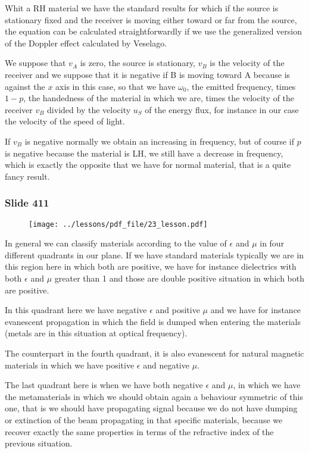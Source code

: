 \documentclass[../main/main.tex]{subfiles}
\begin{document}
Whit a RH material we have the standard results for which if the source is stationary fixed and the receiver is moving either toward or far from the source, the equation can be calculated straightforwardly if we use the generalized version of the Doppler effect calculated by Veselago.

We suppose that $v_A$ is zero, the source is stationary, $v_B$ is the velocity of the receiver and we suppose that it is negative if B is moving toward A because is against the $x$ axis in this case, so that we have $\omega_0$, the emitted frequency, times $1-p$, the handedness of the material in which we are, times the velocity of the receiver $v_B$ divided by the velocity $u_S$ of the energy flux, for instance in our case the velocity of the speed of light.

If $v_B$ is negative normally we obtain an increasing in frequency, but of course if $p$ is negative because the material is LH, we still have a decrease in frequency, which is exactly the opposite that we have for normal material, that is a quite fancy result.

\newpage

\subsubsection{Slide 411}

\begin{figure}[h!]
\centering
\texttt{[image: ../lessons/pdf\_file/23\_lesson.pdf]}
\end{figure}

In general we can classify materials according to the value of $\epsilon$ and $\mu$ in four different quadrants in our plane. If we have standard materials typically we are in this region here in which both are positive, we have for instance dielectrics with both $\epsilon$ and $\mu$ greater than 1 and those are double positive situation in which both are positive.

In this quadrant here we have negative $\epsilon$ and positive $\mu$ and we have for instance evanescent propagation in which the field is dumped when entering the materials (metals are in this situation at optical frequency).

The counterpart in the fourth quadrant, it is also evanescent for natural magnetic materials in which we have positive $\epsilon$ and negative $\mu$. 

The last quadrant here is when we have both negative $\epsilon$ and $\mu$, in which we have the metamaterials in which we should obtain again a behaviour symmetric of this one, that is we should have propagating signal because we do not have dumping or extinction of the beam propagating in that specific materials, because we recover exactly the same properties in terms of the refractive index of the previous situation.
\end{document}
